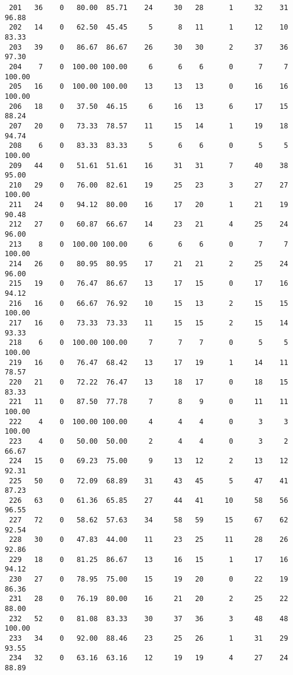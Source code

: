 \begin{verbatim}
 201   36    0   80.00  85.71    24     30   28      1     32    31    96.88
 202   14    0   62.50  45.45     5      8   11      1     12    10    83.33
 203   39    0   86.67  86.67    26     30   30      2     37    36    97.30
 204    7    0  100.00 100.00     6      6    6      0      7     7   100.00
 205   16    0  100.00 100.00    13     13   13      0     16    16   100.00
 206   18    0   37.50  46.15     6     16   13      6     17    15    88.24
 207   20    0   73.33  78.57    11     15   14      1     19    18    94.74
 208    6    0   83.33  83.33     5      6    6      0      5     5   100.00
 209   44    0   51.61  51.61    16     31   31      7     40    38    95.00
 210   29    0   76.00  82.61    19     25   23      3     27    27   100.00
 211   24    0   94.12  80.00    16     17   20      1     21    19    90.48
 212   27    0   60.87  66.67    14     23   21      4     25    24    96.00
 213    8    0  100.00 100.00     6      6    6      0      7     7   100.00
 214   26    0   80.95  80.95    17     21   21      2     25    24    96.00
 215   19    0   76.47  86.67    13     17   15      0     17    16    94.12
 216   16    0   66.67  76.92    10     15   13      2     15    15   100.00
 217   16    0   73.33  73.33    11     15   15      2     15    14    93.33
 218    6    0  100.00 100.00     7      7    7      0      5     5   100.00
 219   16    0   76.47  68.42    13     17   19      1     14    11    78.57
 220   21    0   72.22  76.47    13     18   17      0     18    15    83.33
 221   11    0   87.50  77.78     7      8    9      0     11    11   100.00
 222    4    0  100.00 100.00     4      4    4      0      3     3   100.00
 223    4    0   50.00  50.00     2      4    4      0      3     2    66.67
 224   15    0   69.23  75.00     9     13   12      2     13    12    92.31
 225   50    0   72.09  68.89    31     43   45      5     47    41    87.23
 226   63    0   61.36  65.85    27     44   41     10     58    56    96.55
 227   72    0   58.62  57.63    34     58   59     15     67    62    92.54
 228   30    0   47.83  44.00    11     23   25     11     28    26    92.86
 229   18    0   81.25  86.67    13     16   15      1     17    16    94.12
 230   27    0   78.95  75.00    15     19   20      0     22    19    86.36
 231   28    0   76.19  80.00    16     21   20      2     25    22    88.00
 232   52    0   81.08  83.33    30     37   36      3     48    48   100.00
 233   34    0   92.00  88.46    23     25   26      1     31    29    93.55
 234   32    0   63.16  63.16    12     19   19      4     27    24    88.89

\end{verbatim}
